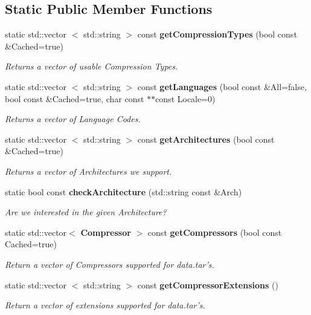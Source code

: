 \subsection*{\-Static \-Public \-Member \-Functions}
\begin{DoxyCompactItemize}
\item 
static std\-::vector\*
$<$ std\-::string $>$ const {\bf get\-Compression\-Types} (bool const \&\-Cached=true)
\begin{DoxyCompactList}\small\item\em \-Returns a vector of usable \-Compression \-Types. \end{DoxyCompactList}\item 
static std\-::vector\*
$<$ std\-::string $>$ const {\bf get\-Languages} (bool const \&\-All=false, bool const \&\-Cached=true, char const $\ast$$\ast$const \-Locale=0)
\begin{DoxyCompactList}\small\item\em \-Returns a vector of \-Language \-Codes. \end{DoxyCompactList}\item 
static std\-::vector\*
$<$ std\-::string $>$ const {\bf get\-Architectures} (bool const \&\-Cached=true)
\begin{DoxyCompactList}\small\item\em \-Returns a vector of \-Architectures we support. \end{DoxyCompactList}\item 
static bool const {\bf check\-Architecture} (std\-::string const \&\-Arch)
\begin{DoxyCompactList}\small\item\em \-Are we interested in the given \-Architecture? \end{DoxyCompactList}\item 
static std\-::vector$<$ {\bf \-Compressor} $>$\*
 const {\bf get\-Compressors} (bool const \-Cached=true)
\begin{DoxyCompactList}\small\item\em \-Return a vector of \-Compressors supported for data.\-tar's. \end{DoxyCompactList}\item 
static std\-::vector\*
$<$ std\-::string $>$ const {\bf get\-Compressor\-Extensions} ()\label{classAPT_1_1Configuration_a337c44f02d8216458b78645ca0a9103f}

\begin{DoxyCompactList}\small\item\em \-Return a vector of extensions supported for data.\-tar's. \end{DoxyCompactList}\end{DoxyCompactItemize}


